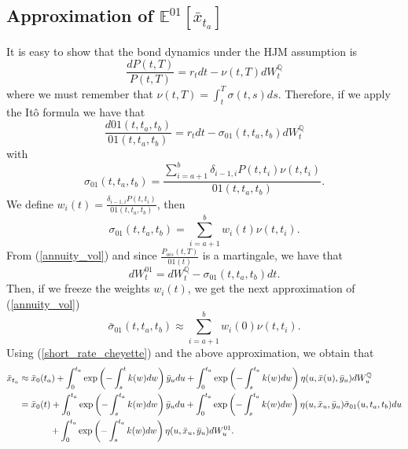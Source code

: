 \documentclass[a4paper,10pt]{article}
\newcommand{\1}{\mathbf{1}}
\begin{document}
\subsection{Approximation of $\mathbb{E}^{01}\left[\bar{x}_{t_a}\right]$}
It is easy to show that the bond dynamics under the HJM assumption is
\begin{equation}
\frac{dP(t,T)}{P(t,T)} = r_t dt - \nu(t,T)dW^{\mathbb{Q}}_t  
\end{equation}
where we must remember that  $\nu(t,T)=\int_{t}^{T}\sigma(t,s) ds$. Therefore, if we apply the Itô formula we have that 
\begin{equation}\label{annuity_spot_dynamic}
\frac{d01(t,t_a,t_b)}{01(t,t_a,t_b)} = r_t dt - \sigma_{01}(t,t_a,t_b)dW^{\mathbb{Q}}_t
\end{equation}
with 
\begin{equation} \label{annuity_vol}
\sigma_{01}(t,t_a,t_b) = \frac{\sum_{i=a+1}^{b} \delta_{i-1,i} P(t,t_i) \nu(t,t_i)}{01(t,t_a,t_b)}.
\end{equation}
We define $w_i(t)=\frac{\delta_{i-1,i} P(t,t_i)}{01(t,t_a,t_b)}$, then
\begin{equation*}
\sigma_{01}(t,t_a,t_b) = \sum_{i=a+1}^{b}  w_i(t) \nu(t,t_i).
\end{equation*}
From (\ref{annuity_vol}) and since $\frac{P_{ois}(t,T)}{01(t)}$ is a martingale, we have that
\begin{equation*}
dW^{01}_t = dW^{\mathbb{Q}}_t - \sigma_{01}(t,t_a,t_b)dt. 
\end{equation*}
Then, if we freeze the weights $w_i(t)$, we get the next approximation of (\ref{annuity_vol})
\begin{equation*} \label{approximation_o1_vol}
\bar{\sigma}_{01}(t,t_a,t_b) \approx \sum_{i=a+1}^{b} w_i(0) \nu(t,t_i).
\end{equation*}
Using (\ref{short_rate_cheyette}) and the above approximation, we obtain that
\begin{align}
\bar{x}_{t_a} &\approx \bar{x}_0(t_a)  + \int_{0}^{t_a} \exp\left(-\int_{s}^{t}k(w)dw\right) \bar{y}_u du + \int_{0}^{t_a}  \exp\left(-\int_{s}^{t_a}k(w)dw \right) \eta(u,\bar{x}(u),\bar{y}_u) dW_u^{\mathbb{Q}} \nonumber \\
&=  \bar{x}_0(t)  + \int_{0}^{t_a} \exp\left(-\int_{s}^{t_a}k(w)dw\right) \bar{y}_u du + \int_{0}^{t_a} \exp\left(-\int_{s}^{t_a}k(w)dw \right) \eta(u,\bar{x}_u,\bar{y}_u) \bar{\sigma}_{01}(u, t_a, t_b) du  \nonumber \\ 
&\hspace{1.2cm} + \int_{0}^{t_a} \exp\left(-\int_{s}^{t_a}k(w)dw\right) \eta(u,\bar{x}_u,\bar{y}_u) dW_u^{01}.
\end{align}
\end{document}
